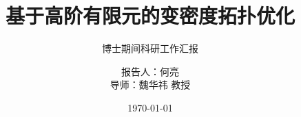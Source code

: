 \documentclass[notheorems]{beamer}
\begin{document}
	
	\title[科研汇报]{基于高阶有限元的变密度拓扑优化}
	\subtitle{博士期间科研工作汇报}
	
	\author[何亮]{报告人：何亮 \\
		\vspace{5pt}
		导师：{魏华祎} 教授}
	
	\date{\today}
	
	\frame[plain]{\titlepage}
	
\end{document}
